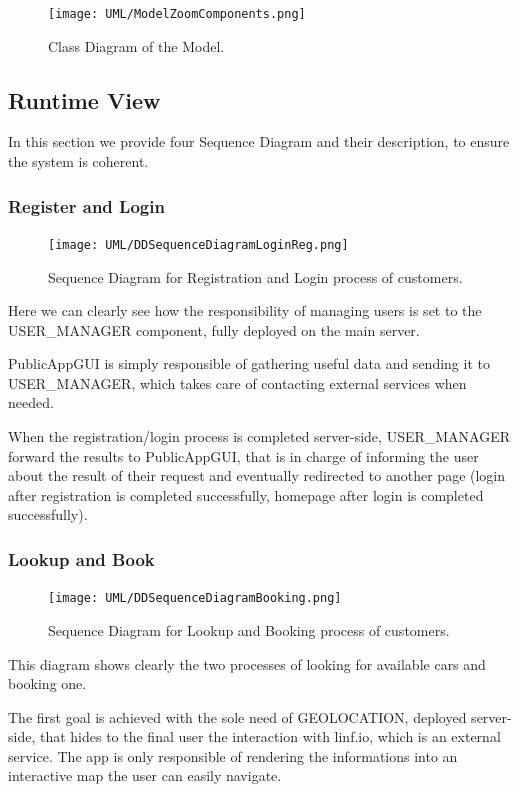 \documentclass[11pt]{article} %
\begin{document}
\begin{figure}[H]
	\centering
	\texttt{[image: UML/ModelZoomComponents.png]}
	\caption{Class Diagram of the Model.}
\end{figure}	


\newpage
\subsection{Runtime View}

In this section we provide four Sequence Diagram and their description, to ensure the system is coherent.

\subsubsection{Register and Login}
\begin{figure}[H]
	\centering
	\texttt{[image: UML/DDSequenceDiagramLoginReg.png]}
	\caption{Sequence Diagram for Registration and Login process of customers.	}
\end{figure}	
Here we can clearly see how the responsibility of managing users is set to the USER\_MANAGER component, fully deployed on the main server.

PublicAppGUI is simply responsible of gathering useful data and sending it to USER\_MANAGER, which takes care of contacting external services when needed. 

When the registration/login process is completed server-side, USER\_MANAGER forward the results to PublicAppGUI, that is in charge of informing the user about the result of their request and eventually redirected to another page (login after registration is completed successfully, homepage after login is completed successfully).

\subsubsection{Lookup and Book}
\begin{figure}[H]
	\centering
	\texttt{[image: UML/DDSequenceDiagramBooking.png]}
	\caption{Sequence Diagram for Lookup and Booking process of customers.}
\end{figure}
This diagram shows clearly the two processes of looking for available cars and booking one.

The first goal is achieved with the sole need of GEOLOCATION, deployed server-side, that hides to the final user the interaction with linf.io, which is an external service. The app is only responsible of rendering the informations into an interactive map the user can easily navigate.
\end{document}
